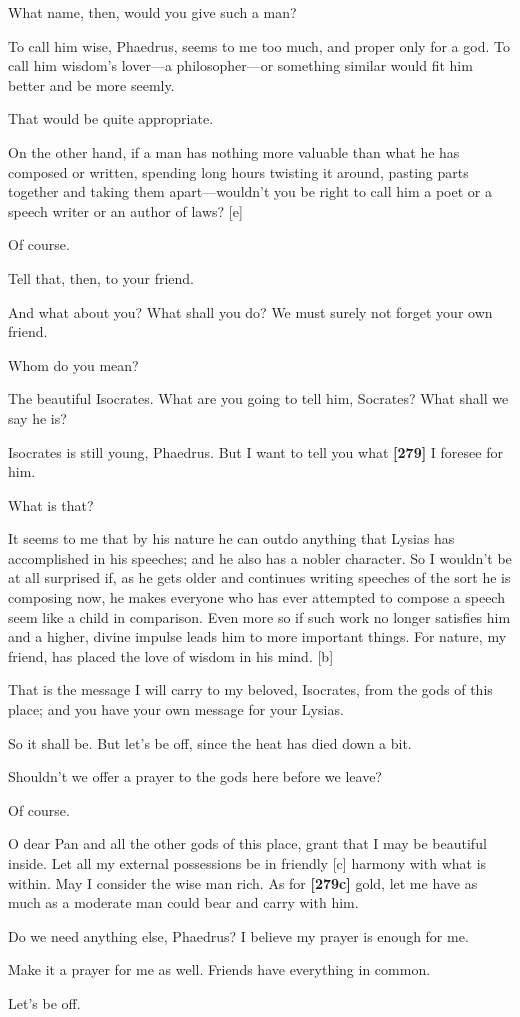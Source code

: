 \sayphaedrus What name, then, would you give such a man?

\saysocrates To call him wise, Phaedrus, seems to me too much, and proper
only for a god. To call him wisdom's lover---a philosopher---or
something similar would fit him better and be more seemly.

\sayphaedrus That would be quite appropriate.

\saysocrates On the other hand, if a man has nothing more valuable than
what he has composed or written, spending long hours twisting it around,
pasting parts together and taking them apart---wouldn't you be right to
call him a poet or a speech writer or an author of laws? {[}e{]}

\sayphaedrus Of course.

\saysocrates Tell that, then, to your friend.

\sayphaedrus And what about you? What shall you do? We must surely not
forget your own friend.

\saysocrates Whom do you mean?

\sayphaedrus The beautiful
Isocrates. What are
you going to tell him, Socrates? What shall we say he is?

\saysocrates Isocrates is still young, Phaedrus. But I want to tell you
what {\bf {[}279{]}} I foresee for him.

\sayphaedrus What is that?

\saysocrates It seems to me that by his nature he can outdo anything that
Lysias has accomplished in his speeches; and he also has a nobler
character. So I wouldn't be at all surprised if, as he gets older and
continues writing speeches of the sort he is composing now, he makes
everyone who has ever attempted to compose a speech seem like a child in
comparison. Even more so if such work no longer satisfies him and a
higher, divine impulse leads him to more important things. For nature,
my friend, has placed the love of wisdom in his mind. {[}b{]}

That is the message I will carry to my beloved, Isocrates, from the gods
of this place; and you have your own message for your Lysias.

\sayphaedrus So it shall be. But let's be off, since the heat has died down
a bit.

\saysocrates Shouldn't we offer a prayer to the gods here before we leave?

\sayphaedrus Of course.

\saysocrates O dear Pan and all the other gods of this place, grant that I
may be beautiful inside. Let all my external possessions be in friendly
{[}c{]} harmony with what is within. May I consider the wise man rich.
As for {\bf {[}279c{]}} gold, let me have as much as a moderate man
could bear and carry with him.

Do we need anything else, Phaedrus? I believe my prayer is enough for
me.

\sayphaedrus Make it a prayer for me as well. Friends have everything in
common.

\saysocrates Let's be off.\crlf
\crlf



